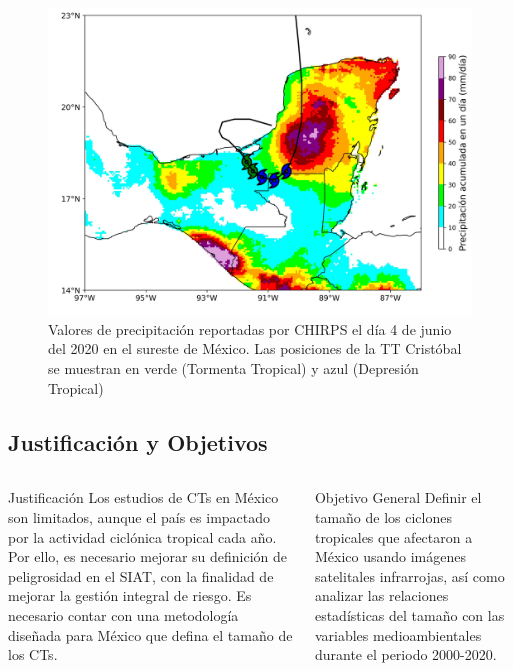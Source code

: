 \begin{frame}
    \begin{figure}
        \includegraphics[scale = 0.35]{Images/Figures/Fig_1_2.jpeg}
        \caption{Valores de precipitación reportadas por CHIRPS el día 4 de junio del 2020 en el sureste de México. Las posiciones de la TT Cristóbal se muestran en verde (Tormenta Tropical) y azul (Depresión Tropical)}
        \label{fig:fig_4}  
    \end{figure}
\end{frame}

\subsection{Justificación y Objetivos}
\begin{frame}
    \hfill
    \begin{columns}
    \begin{column}{0.48\textwidth}
    \begin{block}{Justificación}
    Los estudios de CTs en México son limitados, aunque el país es impactado por la actividad ciclónica tropical cada año. Por ello, es necesario mejorar su definición de peligrosidad en el SIAT, con la finalidad de mejorar la gestión integral de riesgo. Es necesario contar con una metodología diseñada para México que defina el tamaño de los CTs.
\\~\ %
    \end{block}
    \end{column}
    \begin{column}{0.48\textwidth}
    \begin{block}{Objetivo General}
    Definir el tamaño de los ciclones tropicales que afectaron a México usando imágenes satelitales infrarrojas, así como analizar las relaciones estadísticas del tamaño con las variables medioambientales durante el periodo 2000-2020.
\\~\ %
    \end{block}
    \end{column}
    \end{columns}
\end{frame}

